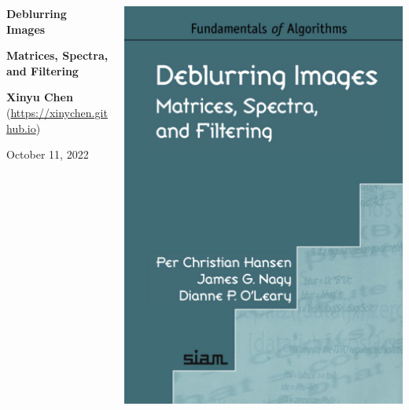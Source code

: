 \documentclass{beamer}
\begin{document}
\begin{frame}[plain]

\begin{columns}
\begin{column}{0.5\textwidth}

\begin{center}
{\color{black!80}\Large\textbf{Deblurring Images}

\vspace{0.2em}

\large\textbf{Matrices, Spectra, and Filtering}}

\small

\vspace{2em}

\textbf{Xinyu Chen} ({\color{fair_blue}\url{https://xinychen.github.io}})

\vspace{0.8em}

{October 11, 2022}

\end{center}

\end{column}

\begin{column}{0.5\textwidth}

\begin{center}
\includegraphics[scale=0.12]{graphics/book-cover.png}
\end{center}


\end{column}
\end{columns}
\end{frame}
\end{document}
